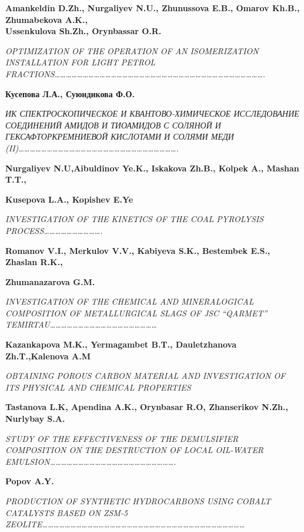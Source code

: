 \textbf{Amankeldin D.Zh., Nurgaliyev N.U., Zhunussova E.B., Omarov
Kh.B., Zhumabekova A.K.,\\
Ussenkulova Sh.Zh., Orynbassar O.R.}

\emph{OPTIMIZATION OF THE OPERATION OF AN ISOMERIZATION INSTALLATION FOR
LIGHT PETROL
FRACTIONS\ldots\ldots\ldots\ldots\ldots\ldots\ldots\ldots\ldots\ldots\ldots\ldots\ldots\ldots\ldots\ldots\ldots\ldots\ldots\ldots\ldots\ldots\ldots\ldots\ldots\ldots\ldots\ldots\ldots\ldots\ldots\ldots\ldots\ldots\ldots\ldots\ldots.}

\textbf{Кусепова Л.А., Суюндикова Ф.О.}

\emph{ИК СПЕКТРОСКОПИЧЕСКОЕ И КВАНТОВО-ХИМИЧЕСКОЕ ИССЛЕДОВАНИЕ
СОЕДИНЕНИЙ АМИДОВ И ТИОАМИДОВ С СОЛЯНОЙ И ГЕКСАФТОРКРЕМНИЕВОЙ КИСЛОТАМИ
И СОЛЯМИ МЕДИ
(II)\ldots\ldots\ldots\ldots\ldots\ldots\ldots\ldots\ldots\ldots\ldots\ldots\ldots\ldots\ldots\ldots\ldots\ldots\ldots\ldots\ldots\ldots\ldots\ldots\ldots\ldots\ldots\ldots.}

\textbf{Nurgaliyev N.U,Aibuldinov Ye.K., Iskakova Zh.B., Kolpek A.,
Mashan T.T.,}

\textbf{Kusepova L.A., Kopishev E.Ye}

\emph{INVESTIGATION OF THE KINETICS OF THE COAL PYROLYSIS
PROCESS\ldots\ldots\ldots\ldots\ldots\ldots\ldots\ldots\ldots\ldots.}

\textbf{Romanov V.I., Merkulov V.V., Kabiyeva S.K., Bestembek E.S.,
Zhaslan R.K.,}

\textbf{Zhumanazarova G.M.}

\emph{INVESTIGATION OF THE CHEMICAL AND MINERALOGICAL COMPOSITION OF
METALLURGICAL SLAGS OF JSC ``QARMET''
TEMIRTAU\ldots\ldots\ldots\ldots\ldots\ldots\ldots\ldots\ldots\ldots\ldots\ldots\ldots\ldots\ldots\ldots\ldots\ldots\ldots{}}

\textbf{Kazankapova M.K., Yermagambet B.T., Dauletzhanova Zh.T.,Kalenova
A.M}

\emph{OBTAINING POROUS CARBON MATERIAL AND INVESTIGATION OF ITS PHYSICAL
AND CHEMICAL PROPERTIES}

\textbf{Tastanova L.K, Apendina A.K., Orynbasar R.O, Zhanserikov N.Zh.,
Nurlybay S.A.}

\emph{STUDY OF THE EFFECTIVENESS OF THE DEMULSIFIER COMPOSITION ON THE
DESTRUCTION OF LOCAL OIL-WATER
EMULSION\ldots\ldots\ldots\ldots\ldots\ldots\ldots\ldots\ldots\ldots\ldots\ldots\ldots\ldots\ldots\ldots\ldots\ldots\ldots\ldots\ldots\ldots.}

\textbf{Popov A.Y.}

\emph{PRODUCTION OF SYNTHETIC HYDROCARBONS USING COBALT CATALYSTS BASED
ON ZSM-5
ZEOLITE\ldots\ldots\ldots\ldots\ldots\ldots\ldots\ldots\ldots\ldots\ldots\ldots\ldots\ldots\ldots\ldots\ldots\ldots\ldots\ldots\ldots\ldots\ldots\ldots\ldots\ldots\ldots\ldots\ldots\ldots\ldots\ldots\ldots\ldots\ldots\ldots{}}


